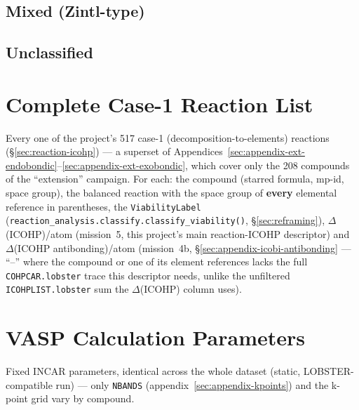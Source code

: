 \documentclass[11pt,a4paper]{article}
\begin{document}
{\small

}

\subsection{Mixed (Zintl-type)}

{\small

}

\subsection{Unclassified}

{\small

}

\section{Complete Case-1 Reaction List}
\label{sec:appendix-full-reactions}

Every one of the project's 517 case-1 (decomposition-to-elements)
reactions (\S\ref{sec:reaction-icohp}) --- a superset of
Appendices~\ref{sec:appendix-ext-endobondic}--\ref{sec:appendix-ext-exobondic},
which cover only the 208 compounds of the ``extension'' campaign.
For each: the compound (starred formula, mp-id, space group), the
balanced reaction with the space group of \textbf{every} elemental
reference in parentheses, the \texttt{ViabilityLabel}
(\texttt{reaction\_analysis.classify.classify\_viability()},
\S\ref{sec:reframing}), $\Delta$(ICOHP)/atom (mission~5, this project's
main reaction-ICOHP descriptor) and $\Delta$(ICOHP antibonding)/atom
(mission~4b, \S\ref{sec:appendix-icobi-antibonding} --- ``--'' where the
compound or one of its element references lacks the full
\texttt{COHPCAR.lobster} trace this descriptor needs, unlike the
unfiltered \texttt{ICOHPLIST.lobster} sum the $\Delta$(ICOHP) column
uses).

{\scriptsize

}

\section{VASP Calculation Parameters}
\label{sec:appendix-incar}

Fixed INCAR parameters, identical across the whole dataset
(static, LOBSTER-compatible run) --- only \texttt{NBANDS}
(appendix~\ref{sec:appendix-kpoints}) and the k-point grid vary by
compound.

\begin{center}

\end{center}
\end{document}
